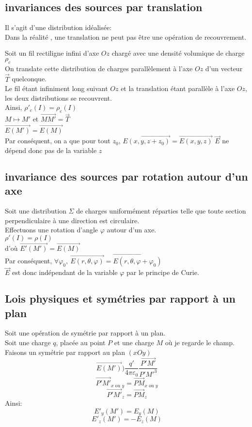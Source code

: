 \documentclass[../main.tex]{subfile}
\begin{document}
\subsection{invariances des sources par translation}
	Il s'agit d'une distribution idéalisée:\\
	Dans la réalité , une translation ne peut pas être une opération de recouvrement.\\
\begin{ex}	
	Soit un fil rectiligne infini d'axe $Oz$ chargé avec une densité volumique de charge $\rho_c$\\
	On translate cette distribution de charges parallèlement à l'axe $Oz$ d'un vecteur $\vec{T}$ quelconque.\\
	Le fil étant infiniment long suivant $Oz$ et la translation étant parallèle à l'axe $Oz$, les deux distributions
	se recouvrent.\\
	Ainsi, $\rho'_c(I) = \rho_c(I)$\\
	$M \mapsto M'$ et $\vec{MM'} = \vec{T}$\\
	$\vec{E(M')} = \vec{E(M)}$\\
	Par conséquent, on a que pour tout $z_0$, 
	$\vec{E(x, y, z + z_0)} = \vec{E(x, y, z)}$
	$\vec{E}$ ne dépend donc pas de la variable $z$
\end{ex}

\subsection{invariance des sources par rotation autour d'un axe}
	Soit une distribution $\Sigma$ de charges uniformément réparties telle que toute section perpendiculaire à une direction est circulaire.\\
	Effectuons une rotation d'angle $\varphi$ autour d'un axe.\\
	$\rho'(I) = \rho(I)$\\
	d'où $\vec{E'(M')} = \vec{E(M)}$\\
	Par conséquent, $\forall \varphi_0, \ \vec{E(r, \theta,\varphi)} = \vec{E(r, \theta, \varphi + \varphi_0)}$\\
	$\vec{E}$ est donc indépendant de la variable $\varphi$ par le principe de Curie.\\

\subsection{Lois physiques et symétries par rapport à un plan}
	Soit une opération de symétrie par rapport à un plan.\\
	Soit une charge $q$, placée au point $P$ et une charge $M$ où je regarde le champ.\\
	Faisons un symétrie par rapport au plan $(xOy)$\\
	$$\vec{E(M')} ) \frac{q'}{4\pi\varepsilon_0} \frac{\vec{P'M'}}{P'M'^3}$$
	$$\vec{P'M'}_{x \text{ ou } y} = \vec{PM}_{x \text{ ou } y}$$
	$$\vec{P'M'}_{z} = \vec{PM}_{z}$$
	Ainsi:
	$$E'_y(M') = E_y(M)$$
	$$E'_z(M') = -E_z(M)$$
\end{document}

